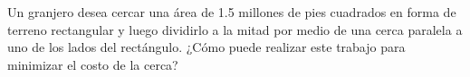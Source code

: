 \item Un granjero desea cercar una área de 1.5 millones de pies cuadrados en forma de terreno rectangular y luego dividirlo a la mitad por medio de una cerca paralela a uno de los lados del rectángulo. ¿Cómo puede realizar este trabajo para minimizar el costo de la cerca?
